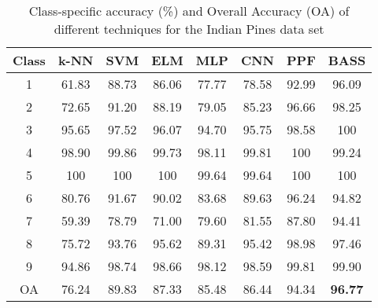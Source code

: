\documentclass[journal]{IEEEtran}
\begin{document}
\begin{table}
\centering
\caption{Class-specific accuracy (\%) and Overall Accuracy (OA) of different techniques for the Indian Pines data set}
\label{table:IndianPines_acc_comp}
\begin{tabular}{|c|c|c|c|c|c|c|c|}
\hline
Class & k-NN  & SVM   & ELM   & MLP   & CNN   & PPF   & BASS             \\ \hline
1     & 61.83 & 88.73 & 86.06 & 77.77 & 78.58 & 92.99 & 96.09            \\
2     & 72.65 & 91.20 & 88.19 & 79.05 & 85.23 & 96.66 & 98.25            \\
3     & 95.65 & 97.52 & 96.07 & 94.70 & 95.75 & 98.58 & 100              \\
4     & 98.90 & 99.86 & 99.73 & 98.11 & 99.81 & 100   & 99.24            \\
5     & 100   & 100   & 100   & 99.64 & 99.64 & 100   & 100              \\
6     & 80.76 & 91.67 & 90.02 & 83.68 & 89.63 & 96.24 & 94.82            \\
7     & 59.39 & 78.79 & 71.00 & 79.60 & 81.55 & 87.80 & 94.41            \\
8     & 75.72 & 93.76 & 95.62 & 89.31 & 95.42 & 98.98 & 97.46            \\
9     & 94.86 & 98.74 & 98.66 & 98.12 & 98.59 & 99.81 & 99.90            \\ \hline
OA    & 76.24 & 89.83 & 87.33 & 85.48 & 86.44 & 94.34 & \textbf{96.77} \\ \hline
\end{tabular}
\end{table}
\end{document}
